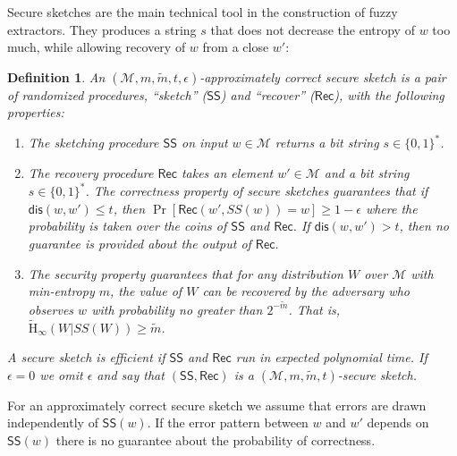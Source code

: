 \documentclass[11pt]{article}
\newcommand{\secref}[1]{\mbox{Section~\ref{#1}}}
\newcommand{\defref}[1]{\mbox{Definition~\ref{#1}}}
\newcommand{\class}[1]{{\ensuremath{\mathsf{#1}}}}
\newcommand{\sketch}{\ensuremath{\class{SS}}\xspace}
\newcommand{\rec}{\ensuremath{\class{Rec}}\xspace}
\newcommand{\dis}{\ensuremath{\mathsf{dis}}}
\newcommand{\Hav}{\tilde{\mathrm{H}}_\infty}
\newtheorem{definition}[theorem]{Definition}
\newcommand{\authnote}[2]{{\textcolor{red}{\textsf{#1 notes: }\textcolor{blue}{ #2}}\marginpar{\textcolor{red}{\textbf{!!!!!}}}}}
\newcommand{\authnote}[2]{}
\newcommand{\lnote}[1]{{\authnote{Leo}{#1}}}
\begin{document}
Secure sketches are the main technical tool in the construction of fuzzy extractors.  They produces a string $s$ that does not decrease the entropy of $w$ too much, while allowing recovery of $w$ from a  close $w'$:
\begin{definition}%
\label{def:secure sketch}
An $(\mathcal{M},m, \tilde{m}, t, \epsilon)$-\emph{approximately correct secure sketch} is a pair of randomized procedures, ``sketch'' (\sketch) and ``recover'' (\rec), with the following properties:
\begin{enumerate}
\item The sketching procedure \sketch on input $w\in\mathcal{M}$ returns a bit string $s\in\{0,1\}^*$.
\item The recovery procedure \rec takes an element $w'\in\mathcal{M}$ and a bit string $s\in\{0,1\}^*$.  The \emph{correctness} property of secure sketches guarantees that if $\dis(w,w')\leq t$, then $\Pr[\rec(w',SS(w))=w]\geq 1-\epsilon$ where the probability is taken over the coins of $\sketch$ and $\rec$.  If $\dis(w,w')>t$, then no guarantee is provided about the output of \rec.
\item The \emph{security} property guarantees that for any distribution $W$ over $\mathcal{M}$ with min-entropy $m$, the value of $W$ can be recovered by the adversary who observes $w$ with probability no greater than $2^{-\tilde{m}}$.  That is, $\Hav(W|SS(W))\geq \tilde{m}$.
\end{enumerate}
A secure sketch is \emph{efficient} if \sketch and \rec run in expected polynomial time.  If $\epsilon=0$ we omit $\epsilon$ and say that $(\sketch, \rec)$ is a $(\mathcal{M},m, \tilde{m}, t)$-\emph{secure sketch}.
\end{definition}
For an approximately correct secure sketch we assume that errors are drawn independently of $\sketch(w)$.  If the error pattern between $w$ and $w'$ depends on $\sketch(w)$ there is no guarantee about the probability of correctness.
\end{document}
